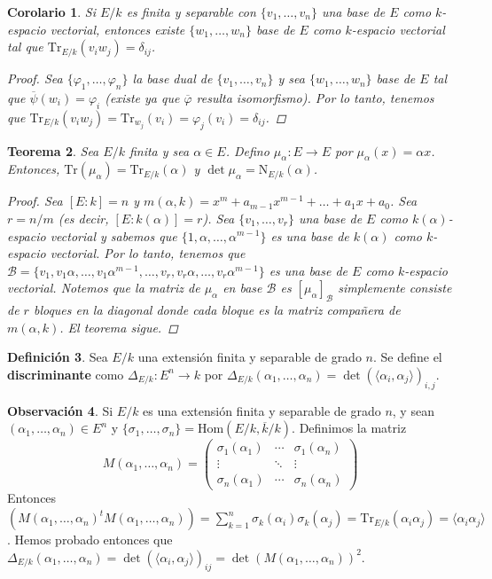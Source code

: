 \documentclass[12pt]{book}
\newtheorem{teo}{Teorema}[section]
\newtheorem{cor}[teo]{Corolario}
\theoremstyle{definition}
\newtheorem{obs}[teo]{Observación}
\newtheorem{defn}[teo]{Definición}
\renewcommand{\hom}{\mathrm{Hom}}
\begin{document}
\begin{cor}
Si $E/k$ es finita y separable con $\{v_1,\ldots , v_n\}$ una base de $E$ como $k$-espacio vectorial, entonces existe $\{w_1,\ldots , w_n\}$ base de $E$ como $k$-espacio vectorial tal que $\mathrm{Tr}_{E/k}(v_iw_j)=\delta_{ij}$.
\begin{proof}
Sea $\{\varphi_1,\ldots , \varphi_n\}$ la base dual de $\{v_1,\ldots ,v_n\}$ y sea $\{w_1,\ldots , w_n\}$ base de $E$ tal que $\overline{\psi}(w_i)=\varphi_i$ (existe ya que $\overline{\varphi}$ resulta isomorfismo). Por lo tanto, tenemos que $\mathrm{Tr}_{E/k}(v_iw_j)=\mathrm{Tr}_{w_j}(v_i) = \varphi_{j}(v_i)=\delta_{ij}$.
\end{proof}
\end{cor}

\begin{teo}
Sea $E/k$ finita y sea $\alpha\in E$. Defino $\mu_\alpha:E\to E$ por $\mu_\alpha(x)=\alpha x$. Entonces, $\mathrm{Tr}(\mu_\alpha)=\mathrm{Tr}_{E/k}(\alpha)$ y $\det\mu_\alpha = \mathrm{N}_{E/k}(\alpha)$.
\begin{proof}
Sea $[E:k]=n$ y $m(\alpha,k) = x^m + a_{m-1}x^{m-1}+\ldots + a_1 x + a_0$. Sea $r=n/m$ (es decir, $[E:k(\alpha)]=r$). Sea $\{v_1,\ldots , v_r\}$ una base de $E$ como $k(\alpha)$-espacio vectorial y sabemos que $\{1,\alpha,\ldots , \alpha^{m-1}\}$ es una base de $k(\alpha)$ como $k$-espacio vectorial. Por lo tanto, tenemos que $\mathscr{B}=\{v_1,v_1\alpha,\ldots , v_1\alpha^{m-1},\ldots , v_r,v_r\alpha,\ldots, v_r\alpha^{m-1}\}$ es una base de $E$ como $k$-espacio vectorial. Notemos que la matriz de $\mu_\alpha$ en base $\mathscr{B}$ es $[\mu_\alpha]_{\mathscr{B}}$ simplemente consiste de $r$ bloques en la diagonal donde cada bloque es la matriz compañera de $m(\alpha,k)$. El teorema sigue.
\end{proof}
\end{teo}

\begin{defn}
Sea $E/k$ una extensión finita y separable de grado $n$. Se define el \textbf{discriminante} como $\Delta_{E/k}:E^n\to k$ por $\Delta_{E/k}(\alpha_1,\ldots , \alpha_n) = \det(\langle \alpha_i,\alpha_j\rangle)_{i,j}$.
\end{defn}

\begin{obs}
Si $E/k$ es una extensión finita y separable de grado $n$, y sean $(\alpha_1,\ldots , \alpha_n)\in E^n$ y $\{\sigma_1,\ldots,\sigma_n\}=\hom(E/k,\overline{k}/k)$. Definimos la matriz $$ M(\alpha_1,\ldots ,\alpha_n) = \begin{pmatrix}\sigma_1(\alpha_1) & \cdots & \sigma_1(\alpha_n) \\ \vdots & \ddots & \vdots \\ \sigma_n(\alpha_1) & \cdots & \sigma_n(\alpha_n)\end{pmatrix}$$ Entonces $(M(\alpha_1,\ldots,\alpha_n)^t M(\alpha_1,\ldots ,\alpha_n)) = \displaystyle\sum_{k=1}^n \sigma_k(\alpha_i)\sigma_k(\alpha_j) = \mathrm{Tr}_{E/k}(\alpha_i\alpha_j) = \langle \alpha_i\alpha_j\rangle$. Hemos probado entonces que $\Delta_{E/k}(\alpha_1,\ldots ,\alpha_n) = \det(\langle \alpha_i,\alpha_j\rangle)_{ij}=\det(M(\alpha_1,\ldots,\alpha_n))^2$.
\end{obs}
\end{document}
